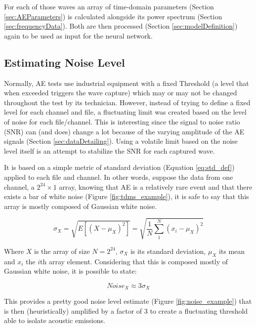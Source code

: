 For each of those waves an array of time-domain parameters (Section \ref{sec:AEParameters}) is calculated alongside its power spectrum (Section \ref{sec:frequencyData}). Both are then processed (Section \ref{sec:modelDefinition}) again to be used as input for the neural network.

\subsection{Estimating Noise Level}\label{sec:noiseLevel}

Normally, AE tests use industrial equipment with a fixed Threshold (a level that when exceeded triggers the wave capture) which may or may not be changed throughout the test by its technician. However, instead of trying to define a fixed level for each channel and file, a fluctuating limit was created based on the level of noise for each file/channel. This is interesting since the signal to noise ratio (SNR) can (and does) change a lot because of the varying amplitude of the AE signals (Section \ref{sec:dataDetailing}). Using a volatile limit based on the noise level itself is an attempt to stabilize the SNR for each captured wave.

It is based on a simple metric of standard deviation (Equation \ref{eq:std_def}) applied to each file and channel. In other words, suppose the data from one channel, a $2^{24} \times 1$ array, knowing that AE is a relatively rare event and that there exists a bar of white noise (Figure \ref{fig:tdms_example}), it is safe to say that this array is mostly composed of Gaussian white noise. 

\begin{equation}\label{eq:std_def}
	\sigma_{X} = \sqrt{E[(X-\mu_{X})^{2}]} = \sqrt{\frac{1}{N}\sum_{1}^{N} (x_{i} - \mu_{X})^{2}}
\end{equation}

Where $X$ is the array of size $N=2^{24}$, $\sigma_{X}$ is its standard deviation, $\mu_{X}$ its mean and $x_{i}$ the $i$th array element. Considering that this is composed mostly of Gaussian white noise, it is possible to state:

\begin{equation}
	Noise_{X} \approx 3\sigma_{X}
\end{equation}

This provides a pretty good noise level estimate (Figure \ref{fig:noise_example}) that is then (heuristically) amplified by a factor of $3$ to create a fluctuating threshold able to isolate acoustic emissions.


